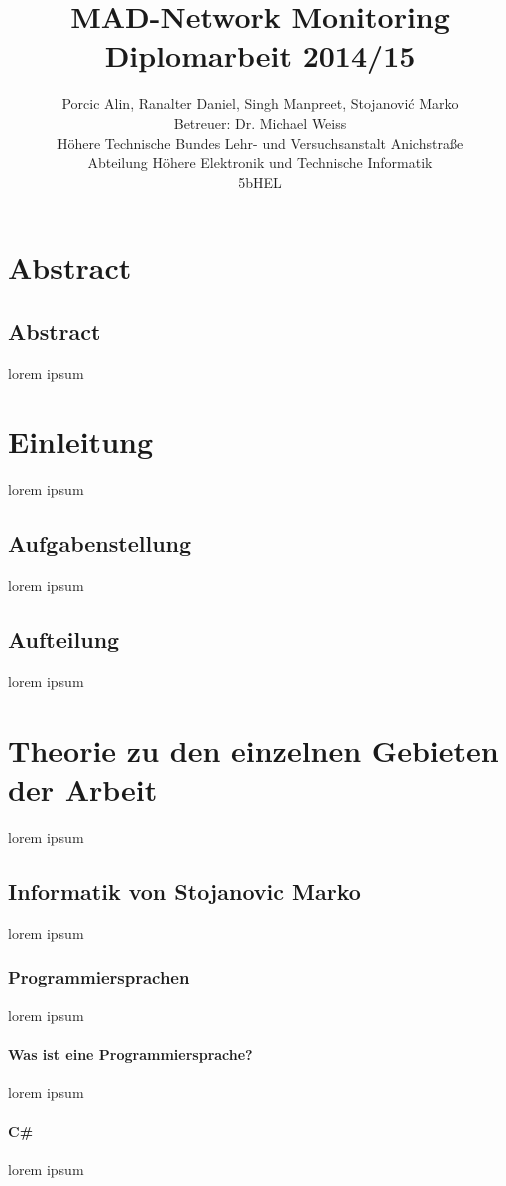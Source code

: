 \documentclass[11pt,a4paper]{report}
\title{MAD-Network Monitoring\\
Diplomarbeit 2014/15}
\author{Porcic Alin, Ranalter Daniel, Singh Manpreet, Stojanovi\'{c} Marko\\
Betreuer: Dr. Michael Weiss\\
Höhere Technische Bundes Lehr- und Versuchsanstalt Anichstraße\\
Abteilung Höhere Elektronik und Technische Informatik\\
5bHEL}
\begin{document}
\maketitle
\newpage

\tableofcontents
\newpage

\pagestyle{fancy}
\part{Abstract}
\chapter{Abstract}
\thispagestyle{fancy}

lorem ipsum

\part{Einleitung}
\thispagestyle{fancy}

lorem ipsum

\chapter{Aufgabenstellung}
lorem ipsum

\chapter{Aufteilung}
lorem ipsum 

\part{Theorie zu den einzelnen Gebieten der Arbeit}
lorem ipsum

\chapter{Informatik von Stojanovic Marko}
lorem ipsum

\section{Programmiersprachen}
lorem ipsum
\subsection{Was ist eine Programmiersprache?}
lorem ipsum
\subsection{C\#}
lorem ipsum
\end{document}
